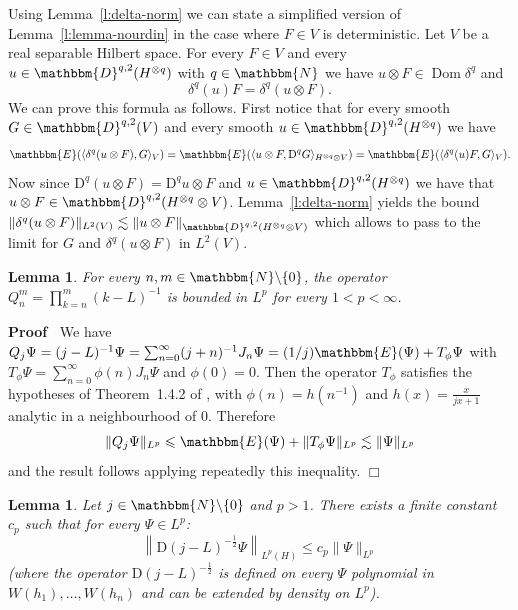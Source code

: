 \documentclass[a4paper,11pt]{article}
\newcommand{\mathD}{\mathrm{D}}
\newcommand{\tmop}[1]{\ensuremath{\operatorname{#1}}}
\newenvironment{proof}{\noindent\textbf{Proof\ }}{\hspace*{\fill}$\Box$\medskip}
\newtheorem{lemma}[theorem]{Lemma}
{\theorembodyfont{\rmfamily}\newtheorem{remark}[theorem]{Remark}}
\begin{document}
\begin{remark}
  \label{r:delta-deterministic}Using Lemma~\ref{l:delta-norm} we can state a
  simplified version of Lemma~\ref{l:lemma-nourdin} in the case where $F \in
  V$ is deterministic. Let $V$ be a real separable Hilbert space. For every $F
  \in V$ and every $u \in \mathbbm{D}^{q, 2} (H^{\otimes q})$ with $q \in
  \mathbbm{N}$ we have $u \otimes F \in \tmop{Dom} \delta^q$ and
  \[ \delta^q (u) F = \delta^q (u \otimes F) . \]
  We can prove this formula as follows. First notice that for every smooth $G
  \in \mathbbm{D}^{q, 2} (V)$ and every smooth $u \in \mathbbm{D}^{q, 2}
  (H^{\otimes q})$ we have
  \[ \mathbbm{E} (\langle \delta^q (u \otimes F), G \rangle_V) =\mathbbm{E}
     (\langle u \otimes F, \mathD^q G \rangle_{H^{\otimes q} \otimes V})
     =\mathbbm{E} (\langle \delta^q (u) F, G \rangle_V) . \]
  Now since $\mathD^q (u \otimes F) = \mathD^q u \otimes F$ and $u \in
  \mathbbm{D}^{q, 2} (H^{\otimes q})$ we have that $u \otimes F \in
  \mathbbm{D}^{q, 2} (H^{\otimes q} \otimes V)$. Lemma~\ref{l:delta-norm}
  yields the bound $\| \delta^q (u \otimes F) \|_{L^2 (V)} \lesssim \| u
  \otimes F \|_{\mathbbm{D}^{q, 2} (H^{\otimes q} \otimes V)}$ which allows to
  pass to the limit for $G$ and $\delta^q (u \otimes F)$ in $L^2 (V)$.
\end{remark}

\begin{lemma}
  \label{l:bounded-q}For every $n, m \in \mathbbm{N}\backslash \{ 0 \}$, the
  operator $Q_n^m = \prod_{k = n}^m (k - L)^{- 1}$ is bounded in $L^p$ for
  every $1 < p < \infty$. 
\end{lemma}

\begin{proof}
  We have $Q_j \Psi = (j - L)^{- 1} \Psi = \sum_{n = 0}^{\infty} (j + n)^{- 1}
  J_n \Psi = (1 / j) \mathbbm{E} (\Psi) + T_{\phi} \Psi$ with $T_{\phi} \Psi =
  \sum_{n = 0}^{\infty} \phi (n) J_n \Psi$ and $\phi (0) = 0$. Then the
  operator $T_{\phi}$ satisfies the hypotheses of Theorem~1.4.2 of
  {\cite{nualart_2006}}, with $\phi (n) = h (n^{- 1})$ and $h (x) =
  \frac{x}{jx + 1}$ analytic in a neighbourhood of 0. Therefore
  \[ \| Q_j \Psi \|_{L^p} \leqslant \mathbbm{E} (\Psi) + \| T_{\phi} \Psi
     \|_{L^p} \lesssim \| \Psi \|_{L^p} \]
  and the result follows applying repeatedly this inequality.
\end{proof}

\begin{lemma}
  \label{l:bounded-oper}Let $j \in \mathbbm{N}\backslash \{ 0 \}$ and $p > 1$.
  There exists a finite constant $c_p$ such that for every $\Psi \in L^p$:
  \[ \left\| \mathD (j - L)^{- \frac{1}{2}} \Psi \right\|_{L^p (H)} \leqslant
     c_p \| \Psi \|_{L^p} \]
  (where the operator $\mathD (j - L)^{- \frac{1}{2}}$ is defined on every
  $\Psi$ polynomial in $W (h_1), \ldots, W (h_n)$ and can be extended by
  density on $L^p$).
\end{lemma}
\end{document}
